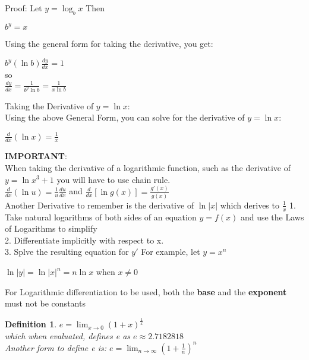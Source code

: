 \documentclass[10pt,a4paper]{article}
\newtheorem{definition}{Definition}
\begin{document}
	Proof: Let $y=\log_{b}{x}$ Then
	\begin{center}
		$b^{y}=x$
	\end{center}
	Using the general form for taking the derivative, you get:
	\begin{center}
		$b^{y}(\ln{b})\frac{dy}{dx}=1$
		\\so
		\\$\frac{dy}{dx}=\frac{1}{b^{y}\ln{b}} = \frac{1}{x\ln{b}}$
	\end{center}
	Taking the Derivative of $y=\ln{x}$:
	\\Using the above General Form, you can solve for the derivative of $y=\ln{x}$:
	\begin{center}
		$\frac{d}{dx}(\ln{x})=\frac{1}{x}$
	\end{center}
	\textbf{IMPORTANT}:
	\\When taking the derivative of a logarithmic function, such as the derivative of $y=\ln{x^{3}+1}$ you will have to use chain rule.
	\\$\frac{d}{dx}(\ln{u}) = \frac{1}{u}\frac{du}{dx}$ and $\frac{d}{dx}[\ln{g(x)}] = \frac{g'(x)}{g(x)}$
	\\Another Derivative to remember is the derivative of $\ln|x|$ which derives to $\frac{1}{x}$
	1. Take natural logarithms of both sides of an equation $y=f(x)$ and use the Laws of Logarithms to simplify
	\\2. Differentiate implicitly with respect to x.
	\\3. Splve the resulting equation for $y'$
	For example, let $y=x^{n}$
	\begin{center}
		$\ln{|y|} = \ln{|x|^{n}}=n\ln{x}$ when $x \neq 0$
	\end{center}
	For Logarithmic differentiation to be used, both the \textbf{base} and the \textbf{exponent} must not be constants
	\begin{definition}
		$e=\lim_{x\rightarrow 0}{(1+x)^{\frac{1}{x}}}$ 
		\\which when evaluated, defines e as $e\approx 2.7182818$
		\\Another form to define e is: 
		$e=\lim_{n\rightarrow\infty}{(1+\frac{1}{n})^{n}}$
	\end{definition}
\end{document}
